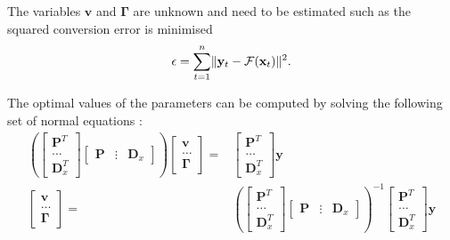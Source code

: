 The variables $\mathbf{v}$ and $\mathbf{\Gamma}$ are unknown and need to be estimated such as the squared conversion error is minimised
\begin{equation}
	\label{eq:conversion_error}
	\epsilon=\sum_{t=1}^{n}\lVert\mathbf{y}_t - \mathcal{F}(\mathbf{x}_t)\rVert^2.
\end{equation}

The optimal values of the parameters can be computed by solving the following set of normal equations \cite{stylianou95}:
\begin{equation}
	\label{eq:param_computed}
	\begin{split}
		\left( 
		\begin{bmatrix}
			\mathbf{P}^T \\
			\dots \\
			\mathbf{D}_x^T
		\end{bmatrix}
		\begin{bmatrix}
			\mathbf{P} & \vdots & \mathbf{D}_x
		\end{bmatrix}
		 \right)
		\begin{bmatrix}
			\mathbf{v} \\
			\dots \\
			\mathbf{\Gamma}
		\end{bmatrix}
		= &
		\begin{bmatrix}
			\mathbf{P}^T \\
			\dots \\
			\mathbf{D}_x^T
		\end{bmatrix}
		\mathbf{y} \\ %
		\begin{bmatrix}
			\mathbf{v} \\
			\dots \\
			\mathbf{\Gamma}
		\end{bmatrix}
		= &
		\left( 
		\begin{bmatrix}
			\mathbf{P}^T \\
			\dots \\
			\mathbf{D}_x^T
		\end{bmatrix}
		\begin{bmatrix}
			\mathbf{P} & \vdots & \mathbf{D}_x
		\end{bmatrix}
		 \right)^{-1}
		\begin{bmatrix}
			\mathbf{P}^T \\
			\dots \\
			\mathbf{D}_x^T
		\end{bmatrix}
		\mathbf{y} \\ %
	\end{split}
\end{equation}
